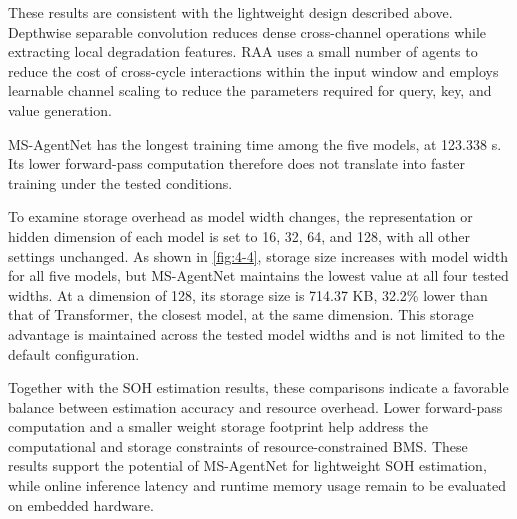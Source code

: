 These results are consistent with the lightweight design described above. Depthwise separable convolution reduces dense cross-channel operations while extracting local degradation features. RAA uses a small number of agents to reduce the cost of cross-cycle interactions within the input window and employs learnable channel scaling to reduce the parameters required for query, key, and value generation.

MS-AgentNet has the longest training time among the five models, at 123.338 s. Its lower forward-pass computation therefore does not translate into faster training under the tested conditions.

To examine storage overhead as model width changes, the representation or hidden dimension of each model is set to 16, 32, 64, and 128, with all other settings unchanged. As shown in \cref{fig:4-4}, storage size increases with model width for all five models, but MS-AgentNet maintains the lowest value at all four tested widths. At a dimension of 128, its storage size is 714.37 KB, 32.2\% lower than that of Transformer, the closest model, at the same dimension. This storage advantage is maintained across the tested model widths and is not limited to the default configuration.

Together with the SOH estimation results, these comparisons indicate a favorable balance between estimation accuracy and resource overhead. Lower forward-pass computation and a smaller weight storage footprint help address the computational and storage constraints of resource-constrained BMS. These results support the potential of MS-AgentNet for lightweight SOH estimation, while online inference latency and runtime memory usage remain to be evaluated on embedded hardware.



